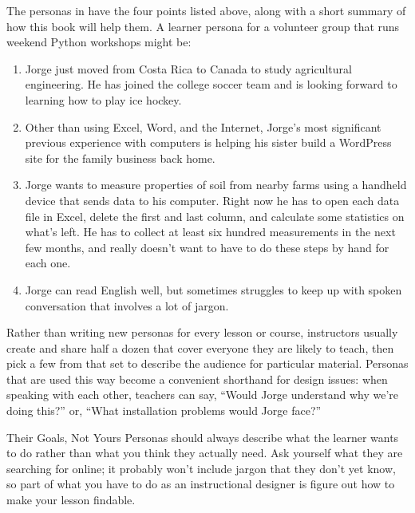 The personas in  have the four points listed above,
along with a short summary of how this book will help them.
A learner persona for a volunteer group that runs weekend Python workshops might be:

\begin{enumerate}

\item
  Jorge just moved from Costa Rica to Canada to study agricultural engineering.
  He has joined the college soccer team
  and is looking forward to learning how to play ice hockey.

\item
  Other than using Excel, Word, and the Internet,
  Jorge's most significant previous experience with computers
  is helping his sister build a WordPress site
  for the family business back home.

\item
  Jorge wants to measure properties of soil from nearby farms
  using a handheld device that sends data to his computer.
  Right now he has to open each data file in Excel,
  delete the first and last column,
  and calculate some statistics on what's left.
  He has to collect at least six hundred measurements in the next few months,
  and really doesn't want to have to do these steps by hand for each one.

\item
  Jorge can read English well,
  but sometimes struggles to keep up with spoken conversation that involves a lot of jargon.

\end{enumerate}

Rather than writing new personas for every lesson or course,
instructors usually create and share half a dozen
that cover everyone they are likely to teach,
then pick a few from that set to describe the audience for particular material.
Personas that are used this way become a convenient shorthand for design issues:
when speaking with each other,
teachers can say,
``Would Jorge understand why we're doing this?''
or,
``What installation problems would Jorge face?''

\begin{aside}{Their Goals, Not Yours}
  Personas should always describe what the learner wants to do
  rather than what you think they actually need.
  Ask yourself what they are searching for online;
  it probably won't include jargon that they don't yet know,
  so part of what you have to do as an instructional designer is
  figure out how to make your lesson findable.
\end{aside}

